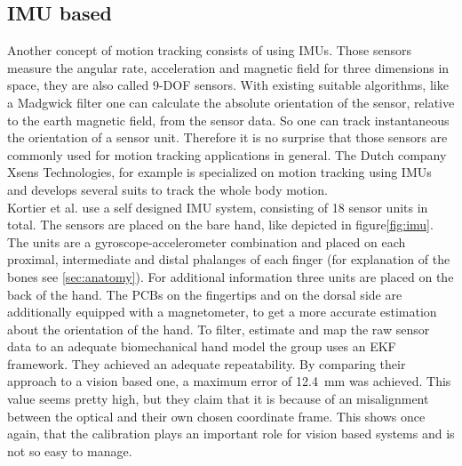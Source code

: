 \subsection{\acs{IMU} based} \label{subsec:approaches:IMU}
Another concept of motion tracking consists of using \acp{IMU}. Those sensors measure the angular rate, acceleration and magnetic field for three dimensions in space, they are also called 9-DOF sensors. With existing suitable algorithms, like a Madgwick filter \cite{madgwick2010efficient} one can calculate the absolute orientation of the sensor, relative to the earth magnetic field, from the sensor data. So one can track instantaneous the orientation of a sensor unit. Therefore it is no surprise that those sensors are commonly used for motion tracking applications in general. The Dutch company Xsens Technologies, for example is specialized on motion tracking using \acp{IMU} and develops several suits to track the whole body motion.\\
Kortier et al. use a self designed \ac{IMU} system, consisting of 18 sensor units in total. The sensors are placed on the bare hand, like depicted in figure\ref{fig:imu}. The units are a gyroscope-accelerometer combination and placed on each proximal, intermediate and distal phalanges of each finger (for explanation of the bones see \ref{sec:anatomy}). For additional information three units are placed on the back of the hand. The PCBs on the fingertips and on the dorsal side are additionally equipped with a magnetometer, to get a more accurate estimation about the orientation of the hand. To filter, estimate and map the raw sensor data to an adequate biomechanical hand model the group uses an \ac{EKF} framework. They achieved an adequate repeatability. By comparing their approach to a vision based one, a maximum error of \SI{12.4}{mm} was achieved. This value seems pretty high, but they claim that it is because of an misalignment between the optical and their own chosen coordinate frame. This shows once again, that the calibration plays an important role for vision based systems and is not so easy to manage.\\
